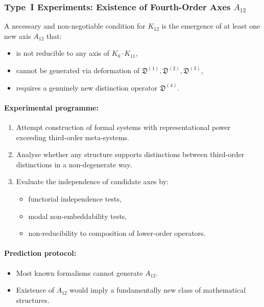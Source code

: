 \subsubsection{Type~I Experiments: Existence of Fourth-Order Axes $A_{12}$}

A necessary and non-negotiable condition for $K_{12}$ is the emergence 
of at least one new axis $A_{12}$ that:

\begin{itemize}
    \item is not reducible to any axis of $K_{0}$–$K_{11}$,
    \item cannot be generated via deformation of  
          $\mathfrak{D}^{(1)}, \mathfrak{D}^{(2)}, \mathfrak{D}^{(3)}$,
    \item requires a genuinely new distinction operator 
          $\mathfrak{D}^{(4)}$.
\end{itemize}

\paragraph{Experimental programme:}

\begin{enumerate}
    \item Attempt construction of formal systems with representational 
          power exceeding third-order meta-systems.
    \item Analyse whether any structure supports distinctions 
          between third-order distinctions in a non-degenerate way.
    \item Evaluate the independence of candidate axes by:
          \begin{itemize}
              \item functorial independence tests,
              \item modal non-embeddability tests,
              \item non-reducibility to composition of lower-order operators.
          \end{itemize}
\end{enumerate}

\paragraph{Prediction protocol:}

\begin{itemize}
    \item Most known formalisms cannot generate $A_{12}$.
    \item Existence of $A_{12}$ would imply a fundamentally new class 
          of mathematical structures.
\end{itemize}



